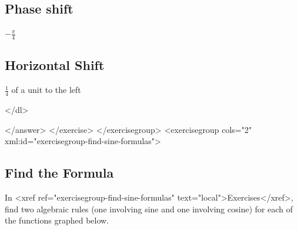                 \subsection*{Phase shift}
                
                  $-\frac{\pi}{4}$
                
              
              \item
                \subsection*{Horizontal Shift}
                
                  $\frac{1}{4}$ of a unit to the left
                
              
            </dl>
          
          
            
            
          
        </answer>
      </exercise>
    </exercisegroup>
    <exercisegroup cols="2" xml:id="exercisegroup-find-sine-formulas">
      \subsection*{Find the Formula}
      
        
          In <xref ref="exercisegroup-find-sine-formulas" text="local">Exercises</xref>, find two algebraic rules (one involving sine and one involving cosine) for each of the functions graphed below.
        
